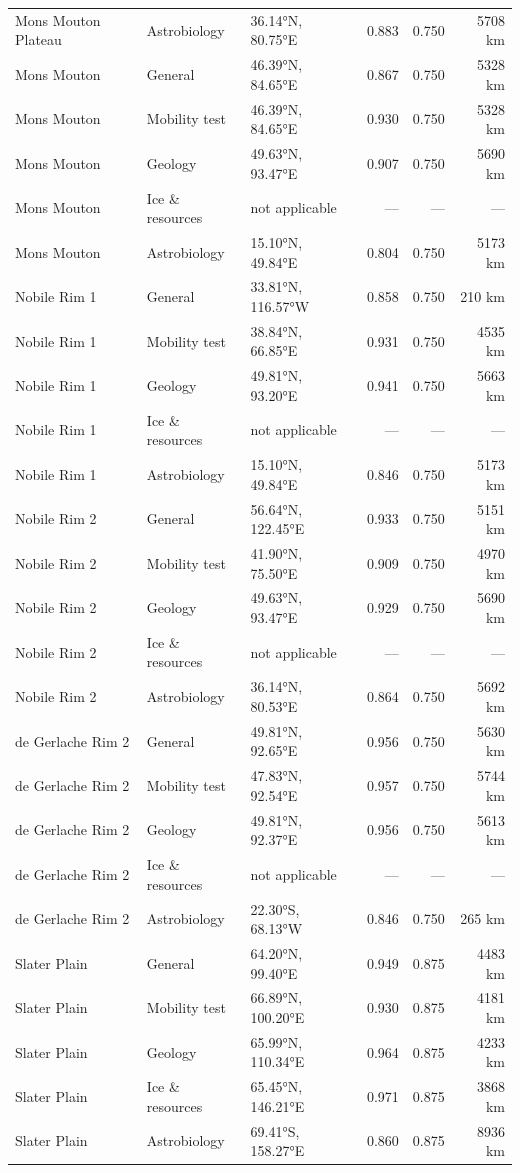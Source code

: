 \begin{table}[ht]
\begin{tabular}{lllrrr}
Mons Mouton Plateau & Astrobiology & 36.14°N, 80.75°E & 0.883 & 0.750 & 5708 km \\
Mons Mouton & General & 46.39°N, 84.65°E & 0.867 & 0.750 & 5328 km \\
Mons Mouton & Mobility test & 46.39°N, 84.65°E & 0.930 & 0.750 & 5328 km \\
Mons Mouton & Geology & 49.63°N, 93.47°E & 0.907 & 0.750 & 5690 km \\
Mons Mouton & Ice \& resources & not applicable & — & — & — \\
Mons Mouton & Astrobiology & 15.10°N, 49.84°E & 0.804 & 0.750 & 5173 km \\
Nobile Rim 1 & General & 33.81°N, 116.57°W & 0.858 & 0.750 & 210 km \\
Nobile Rim 1 & Mobility test & 38.84°N, 66.85°E & 0.931 & 0.750 & 4535 km \\
Nobile Rim 1 & Geology & 49.81°N, 93.20°E & 0.941 & 0.750 & 5663 km \\
Nobile Rim 1 & Ice \& resources & not applicable & — & — & — \\
Nobile Rim 1 & Astrobiology & 15.10°N, 49.84°E & 0.846 & 0.750 & 5173 km \\
Nobile Rim 2 & General & 56.64°N, 122.45°E & 0.933 & 0.750 & 5151 km \\
Nobile Rim 2 & Mobility test & 41.90°N, 75.50°E & 0.909 & 0.750 & 4970 km \\
Nobile Rim 2 & Geology & 49.63°N, 93.47°E & 0.929 & 0.750 & 5690 km \\
Nobile Rim 2 & Ice \& resources & not applicable & — & — & — \\
Nobile Rim 2 & Astrobiology & 36.14°N, 80.53°E & 0.864 & 0.750 & 5692 km \\
de Gerlache Rim 2 & General & 49.81°N, 92.65°E & 0.956 & 0.750 & 5630 km \\
de Gerlache Rim 2 & Mobility test & 47.83°N, 92.54°E & 0.957 & 0.750 & 5744 km \\
de Gerlache Rim 2 & Geology & 49.81°N, 92.37°E & 0.956 & 0.750 & 5613 km \\
de Gerlache Rim 2 & Ice \& resources & not applicable & — & — & — \\
de Gerlache Rim 2 & Astrobiology & 22.30°S, 68.13°W & 0.846 & 0.750 & 265 km \\
Slater Plain & General & 64.20°N, 99.40°E & 0.949 & 0.875 & 4483 km \\
Slater Plain & Mobility test & 66.89°N, 100.20°E & 0.930 & 0.875 & 4181 km \\
Slater Plain & Geology & 65.99°N, 110.34°E & 0.964 & 0.875 & 4233 km \\
Slater Plain & Ice \& resources & 65.45°N, 146.21°E & 0.971 & 0.875 & 3868 km \\
Slater Plain & Astrobiology & 69.41°S, 158.27°E & 0.860 & 0.875 & 8936 km \\
\hline
\end{tabular}
\end{table}